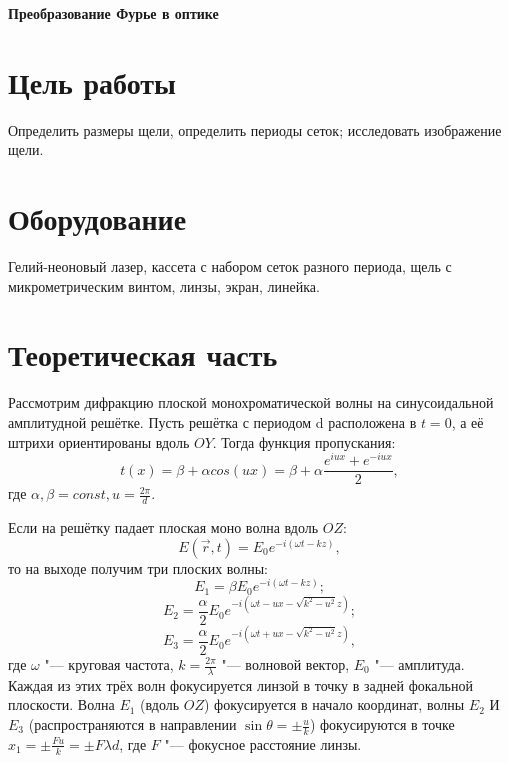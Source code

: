 \documentclass[10pt, a4paper]{article}
\begin{document}
\huge
\begin{center}
\textbf{Преобразование Фурье в оптике}
\end{center}
\parindent=1cm
\large
	\section*{Цель работы}
	
Определить размеры щели, определить периоды сеток; исследовать изображение щели.
	\section*{Оборудование}

	Гелий-неоновый лазер, кассета с набором сеток разного периода, щель с микрометрическим винтом, линзы, экран, линейка.

\section*{Теоретическая часть}
Рассмотрим дифракцию плоской монохроматической волны на синусоидальной амплитудной решётке. Пусть решётка с периодом d расположена в $t = 0$, а её штрихи ориентированы вдоль $OY$. Тогда функция пропускания:
\[
	t(x) = \beta  + \alpha cos(ux) = \beta + \alpha \frac{e^{iux} + e^{-iux}}{2},
\]
где $\alpha, \beta = const, u = \frac{2 \pi}{d}$.

Если на решётку падает плоская моно волна вдоль $OZ$:
\[
	E(\vec r, t) = E_0 e^{-i(\omega t - kz)},
\]
то на выходе получим три плоских волны:
\[
	E_1 = \beta E_0 e^{-i (\omega t - kz)};
\]
\[
	E_2 = \frac{\alpha}{2} E_0 e^{-i (\omega t - ux - \sqrt{k^2 - u^2}z)};
\]
\[
	E_3 = \frac{\alpha}{2} E_0 e^{-i (\omega t + ux - \sqrt{k^2 - u^2}z)},
\]
где $\omega$ "--- круговая частота, $k = \frac{2 \pi}{\lambda}$ "--- волновой вектор, $E_0$ "--- амплитуда.
Каждая из этих трёх волн фокусируется линзой в точку в задней фокальной плоскости. Волна $E_1$ (вдоль $OZ$) фокусируется в начало координат, волны $E_2$ И $E_3$ (распространяются в направлении $\sin \theta = \pm \frac{u}{k}$) фокусируются в точке $x_1 = \pm \frac{Fu}{k} = \pm {F \lambda}{d}$, где $F$ "--- фокусное расстояние линзы.
\end{document}
